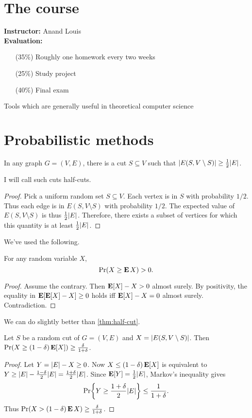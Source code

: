 \chapter*{The course}

\textbf{Instructor:} Anand Louis
\\[1em]
\textbf{Evaluation:}
\begin{itemize}
    \item[(35\%)] Roughly one homework every two weeks
    \item[(25\%)] Study project
    \item[(40\%)] Final exam
\end{itemize}

\begin{center}
    Tools which are generally useful in theoretical computer science
\end{center}

\chapter{Probabilistic methods} \label{chp:prob}
\begin{proposition} \label{thm:half-cut}
    In any graph $G = (V, E)$, there is a cut $S \subseteq V$ such that
    $\lvert E(S, V \setminus S)\rvert \ge \frac12 \lvert E\rvert$.
\end{proposition}
I will call such cuts half-cuts.
\begin{proof}
    Pick a uniform random set $S \subseteq V$.
    Each vertex is in $S$ with probability $1 / 2$.
    Thus each edge is in $E(S, V \setminus S)$ with probability $1 / 2$.
    The expected value of $E(S, V \setminus S)$ is thus $\frac12 \lvert E\rvert$.
    Therefore, there exists a subset of vertices for which this
    quantity is at least $\frac12 \lvert E\rvert$.
\end{proof}
We've used the following.
\begin{lemma}
    For any random variable $X$, \[
        \Pr(X \ge \operatorname{\mathbf E} X) > 0.
    \]
\end{lemma}
\begin{proof}
    Assume the contrary.
    Then $\operatorname{\mathbf E}[X] - X > 0$ almost surely.
    By positivity, the equality in $\operatorname{\mathbf E}[\operatorname{\mathbf E}[X] - X] \ge 0$ holds iff
    $\operatorname{\mathbf E}[X] - X = 0$ almost surely.
    Contradiction.
\end{proof}

We can do slightly better than \cref{thm:half-cut}.
\begin{proposition}
    Let $S$ be a random cut of $G = (V, E)$
    and $X = \lvert E(S, V \setminus S)\rvert$.
    Then $\Pr(X \ge (1 - \delta) \operatorname{\mathbf E}[X]) \ge \frac{\delta}{1 + \delta}$.
\end{proposition}
\begin{proof}
    Let $Y = \lvert E\rvert - X \ge 0$.
    Now $X \le (1 - \delta) \operatorname{\mathbf E}[X]$ is equivalent to
    $Y \ge \lvert E\rvert - \frac{1 - \delta}2 \lvert E\rvert = \frac{1 + \delta}2 \lvert E\rvert$.
    Since $\operatorname{\mathbf E}[Y] = \frac12 \lvert E\rvert$, Markov's inequality gives \[
        \Pr \set*{Y \ge \frac{1 + \delta}{2} \abs{E}}
            \le \frac1{1 + \delta}.
    \] Thus $\Pr(X > (1 - \delta) \operatorname{\mathbf E} X) \ge \frac{\delta}{1 + \delta}$.
\end{proof}

